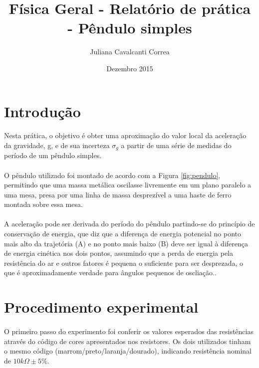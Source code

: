 \documentclass[11pt,a4paper]{article}
\title{Física Geral - Relatório de prática - Pêndulo simples}
\author{Juliana Cavalcanti Correa}
\date{Dezembro 2015}
\begin{document}
   
  \maketitle

  \section{Introdução}
  \label{sec:intro}
    
    \paragraph{}
    Nesta prática, o objetivo é obter uma aproximação do valor local da aceleração da gravidade, g, e de sua incerteza $\sigma_g$ a partir de uma série de medidas do período de um pêndulo simples.

    \paragraph{}
    O pêndulo utilizado foi montado de acordo com a Figura \ref{fig:pendulo}, permitindo que uma massa metálica oscilasse livremente em um plano paralelo a uma mesa, presa por uma linha de massa desprezível a uma haste de ferro montada sobre essa mesa.
    
    \paragraph{}
    A aceleração pode ser derivada do período do pêndulo partindo-se do princípio de conservação de energia, que diz que a diferença de energia potencial no ponto mais alto da trajetória (A) e no ponto mais baixo (B) deve ser igual à diferença de energia cinética nos dois pontos, assumindo que a perda de energia pela resistência do ar e outros fatores é pequena o suficiente para ser desprezada, o que é aproximadamente verdade para ângulos pequenos de oscliação..

  \section{Procedimento experimental}

    \paragraph{}
    O primeiro passo do experimento foi conferir os valores esperados das resistências através do código de cores apresentados nos resistores. Os dois utilizados tinham o mesmo código (marrom/preto/laranja/dourado), indicando resistência nominal de $10k\Omega\pm 5\%$.
\end{document}
